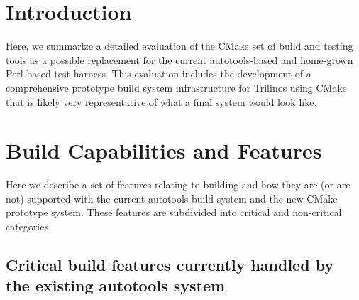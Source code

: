 \documentclass[pdf,ps2pdf,11pt]{SANDreport}
\begin{document}

%
\setcounter{secnumdepth}{3}
\SANDmain %


%
\section{Introduction}
%

Here, we summarize a detailed evaluation of the CMake set of build and
testing tools as a possible replacement for the current
autotools-based and home-grown Perl-based test harness.  This
evaluation includes the development of a comprehensive prototype build
system infrastructure for Trilinos using CMake that is likely very
representative of what a final system would look like.


%
\section{Build Capabilities and Features}
%

Here we describe a set of features relating to building and how they
are (or are not) supported with the current autotools build system and
the new CMake prototype system.  These features are subdivided into
critical and non-critical categories.


%
{}\subsection{Critical build features currently handled by the
existing autotools system}
%
\end{document}
